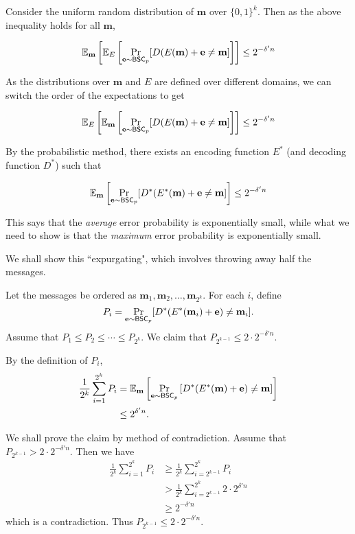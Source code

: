Consider the uniform random distribution of $\textbf{m}$ over $\{0,1\}^k$. Then as the above inequality holds for all $\textbf{m}$,

$$\mathbb{E}_\textbf{m}\left[\mathbb{E}_E\left[\Pr_{\textbf{e}\sim\mathsf{BSC}_p}[D(E(\textbf{m})+\textbf{e}\neq \textbf{m}]\right]\right]
\leq
2^{-\delta'n}
$$

As the distributions over $\textbf{m}$ and $E$ are defined over different domains, we can switch the order of the expectations to get

$$\mathbb{E}_E\left[\mathbb{E}_\textbf{m}\left[\Pr_{\textbf{e}\sim\mathsf{BSC}_p}[D(E(\textbf{m})+\textbf{e}\neq \textbf{m}]\right]\right]
\leq
2^{-\delta'n}
$$

By the probabilistic method, there exists an encoding function $E^*$ (and decoding function $D^*$) such that

$$\mathbb{E}_\textbf{m}\left[\Pr_{\textbf{e}\sim\mathsf{BSC}_p}[D^*(E^*(\textbf{m})+\textbf{e}\neq \textbf{m}]\right]\leq 2^{-\delta'n}$$

This says that the \textit{average} error probability is exponentially small, while what we need to show is that the \textit{maximum} error probability is exponentially small.

We shall show this ``expurgating", which involves throwing away half the messages.

\vspace{2mm}
Let the messages be ordered as $\textbf{m}_1,\textbf{m}_2,\ldots, \textbf{m}_{2^k}$. For each $i$, define
$$P_i=\Pr_{\textbf{e}\sim\mathsf{BSC}_p}[D^*(E^*(\textbf{m}_i)+\textbf{e})\neq \textbf{m}_i].$$ Assume that $P_1\leq P_2\leq\cdots\leq P_{2^k}$. We claim that $P_{2^{k-1}}\leq 2\cdot 2^{-\delta'n}$.

By the definition of $P_i$,
\begin{align*}
    \frac{1}{2^k}\sum_{i=1}^{2^k}P_i
    &=\mathbb{E}_\textbf{m}\left[\Pr_{\textbf{e}\sim\mathsf{BSC}_p}\left[D^*(E^*(\textbf{m})+\textbf{e})\neq \textbf{m}\right]\right] \\
    &\leq 2^{\delta'n}.
\end{align*}

We shall prove the claim by method of contradiction. Assume that $P_{2^{k-1}}>2\cdot 2^{-\delta'n}$. Then we have
\begin{align*}
    \frac{1}{2^k}\sum_{i=1}^{2^k}P_i
    &\geq \frac{1}{2^k}\sum_{i=2^{k-1}}^{2^k}P_i \\
    &> \frac{1}{2^k}\sum_{i=2^{k-1}}^{2^k} 2\cdot 2^{\delta'n} \\
    &\geq 2^{-\delta'n}
\end{align*}
which is a contradiction. Thus $P_{2^{k-1}}\leq 2\cdot 2^{-\delta'n}$.

